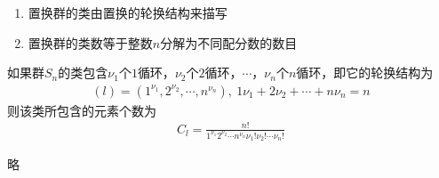 \begin{note}
	\begin{enumerate}
		\item {\color{seco}置换群的类由置换的轮换结构来描写}
		\item {\color{seco}置换群的类数等于整数$n$分解为不同配分数的数目}
	\end{enumerate}
\end{note}

\begin{newthem}[类的元素数目]
	如果群$S_n$的类包含$\nu_1$个$1$循环，$\nu_2$个$2$循环，$\cdots$，$\nu_n$个$n$循环，即它的轮换结构为
	\begin{equation}\begin{aligned}
	(l)=(1^{\nu_1},2^{\nu_2},\cdots,n^{\nu_n}),
	~1\nu_1+2\nu_2+\cdots+n\nu_n=n
	\end{aligned}\end{equation}
	则该类所包含的元素个数为
	\begin{equation}\begin{aligned}
	C_l=\frac{n!}
	{
	1^{\nu_1}2^{\nu_2}\cdots n^{\nu_n}
	\nu_1! \nu_2! \cdots \nu_n!
	}
	\end{aligned}\end{equation}
\end{newthem}

\begin{newproof}
	略
%	
\end{newproof}

